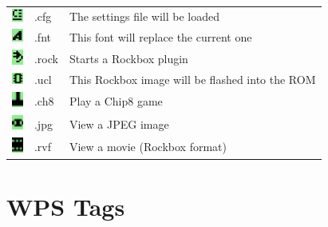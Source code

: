 \begin{center}
\begin{tabular}{lll}
\includegraphics[width=0.37cm]{appendix/images/icon-config.png} & .cfg & The settings file will be loaded\\
\includegraphics[width=0.37cm]{appendix/images/icon-font.png} & .fnt & This font will replace the current one\\
\includegraphics[width=0.37cm]{appendix/images/icon-rock.png} & .rock & Starts a Rockbox plugin\\
\includegraphics[width=0.37cm]{appendix/images/icon-ucl.png} & .ucl & This Rockbox image will be flashed into the ROM \\
\includegraphics[width=0.37cm]{appendix/images/icon-chip8.png} & .ch8 & Play a Chip8 game \\
\includegraphics[width=0.37cm]{appendix/images/icon-image-file.png} & .jpg & View a JPEG image \\
\includegraphics[width=0.37cm]{appendix/images/icon-movie-file.png} & .rvf & View a movie (Rockbox format)\\\bottomrule
\end{tabular}
\end{center}

\chapter{\label{ref:wps_tags}WPS Tags}


